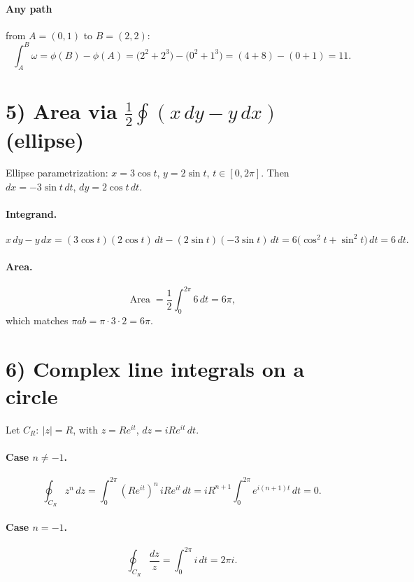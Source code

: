 \documentclass[11pt]{article}
\begin{document}
\paragraph{Any path} from $A=(0,1)$ to $B=(2,2)$:
\[
\int_{A}^{B}\omega
=
\phi(B)-\phi(A)
=
\bigl(2^{2}+2^{3}\bigr)-\bigl(0^{2}+1^{3}\bigr)
=
(4+8)-(0+1)
=
11.
\]

\bigskip

\section*{5) Area via $\displaystyle \frac12\oint(x\,dy-y\,dx)$ (ellipse)}
Ellipse parametrization: $x=3\cos t$, $y=2\sin t$, $t\in[0,2\pi]$.
Then $dx=-3\sin t\,dt$, $dy=2\cos t\,dt$.

\paragraph{Integrand.}
\[
x\,dy-y\,dx
=
(3\cos t)(2\cos t)\,dt
-
(2\sin t)(-3\sin t)\,dt
=
6\bigl(\cos^{2}t+\sin^{2}t\bigr)\,dt
=
6\,dt.
\]

\paragraph{Area.}
\[
\operatorname{Area}
=
\frac12\int_{0}^{2\pi} 6\,dt
=
6\pi,
\]
which matches $\pi ab=\pi\cdot 3\cdot 2=6\pi$.

\bigskip

\section*{6) Complex line integrals on a circle}
Let $C_R:\ |z|=R$, with $z=Re^{it}$, $dz=iRe^{it}\,dt$.

\paragraph{Case $n\neq -1$.}
\[
\oint_{C_R} z^{n}\,dz
=
\int_{0}^{2\pi} (Re^{it})^{n}\,iRe^{it}\,dt
=
iR^{n+1}\int_{0}^{2\pi} e^{i(n+1)t}\,dt
=
0.
\]

\paragraph{Case $n=-1$.}
\[
\oint_{C_R} \frac{dz}{z}
=
\int_{0}^{2\pi} i\,dt
=
2\pi i.
\]

\bigskip
\end{document}

